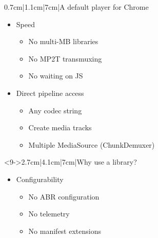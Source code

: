 \documentclass{beamer}
\begin{document}
\begin{frame}
    \begin{block}{0.7cm|1.1cm|7cm|A default player for Chrome}
        \begin{itemize}[<+->]
            \item<1->Speed
            \begin{itemize}[<+->]
                \item<2-> No multi-MB libraries
                \item<3-> No MP2T transmuxing
                \item<4-> No waiting on JS
            \end{itemize}
            \item<5->Direct pipeline access
            \begin{itemize}[<+->]
                \item<6-> Any codec string
                \item<7-> Create media tracks
                \item<8-> Multiple MediaSource (ChunkDemuxer)
            \end{itemize}
        \end{itemize}
    \end{block}

    \begin{block}<9->{2.7cm|4.1cm|7cm|Why use a library?}
        \begin{itemize}[<+->]
            \item<10->Configurability
            \begin{itemize}[<+->]
                \item<11-> No ABR configuration
                \item<12-> No telemetry
                \item<13-> No manifest extensions
            \end{itemize}
        \end{itemize}
    \end{block}
\end{frame}
\end{document}
